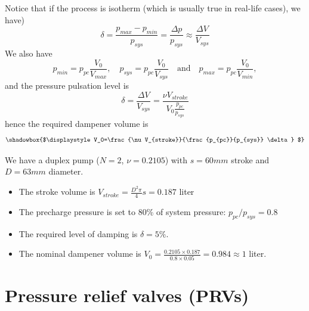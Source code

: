 \noindent Notice that if the process is isotherm (which is usually true in real-life cases), we have)
%
\begin{equation}
\delta =\frac{p_{max}-p_{min}}{p_{sys}} = \frac{\Delta p}{p_{sys}} \approx\frac{\Delta V}{V_{sys}}
\end{equation}
%
\noindent We also have
%
\begin{equation}
p_{min}=p_{pc} \frac{V_0}{V_{max}}, \quad p_{sys}=p_{pc} \frac{V_0}{V_{sys}}\quad \text{and} \quad p_{max}=p_{pc} \frac{V_0}{V_{min}},
\end{equation}
%
and the pressure pulsation level is 
%
\begin{equation}
\delta =\frac{\Delta V}{V_{sys}} = \frac{\nu V_{stroke}}{V_0 \frac{p_{pc}}{p_{sys}}}
\label{eq:delta}
\end{equation}
%
hence the required dampener volume is
%
\begin{equation}
\shadowbox{$\displaystyle
V_0=\frac{\nu V_{stroke}}{\frac{p_{pc}}{p_{sys}} \delta}
$}
\end{equation}


 We have a duplex pump ($N=2$, $\nu=0.2105$) with $s=60mm$ stroke and $D=63mm$ diameter.
%
\begin{itemize}
\item The stroke volume is $V_{stroke}=\frac{D^2 \pi}{4}s = 0.187$ liter
\item The precharge pressure is set to 80\% of system pressure: $p_{pc}/p_{sys}=0.8$
\item The required level of damping is $\delta=5\%$.
\item The nominal dampener volume is $V_0=\frac{0.2105 \times 0.187}{0.8\times 0.05}=0.984\approx1$ liter.
\end{itemize}

\clearpage



\section{Pressure relief valves (PRVs)} \label{sec:pressure_relief_valve}

